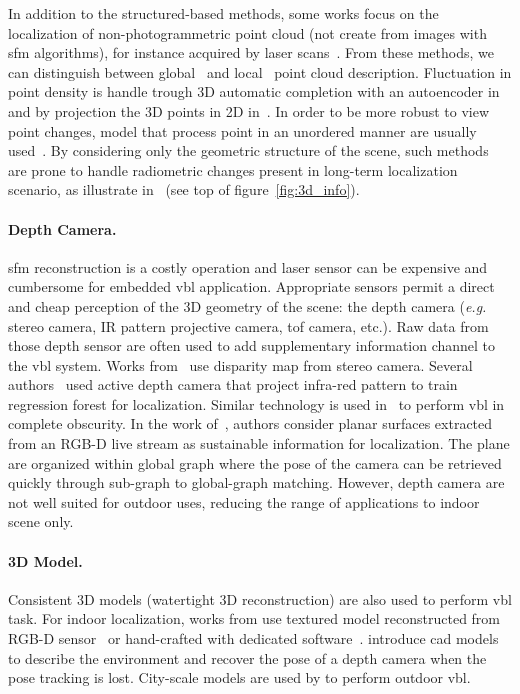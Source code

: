 			In addition to the structured-based methods, some works focus on the localization of non-photogrammetric point cloud (\ie not create from images with \ac{sfm} algorithms), for instance acquired by laser scans~\citep{Elbaz2017,Uy2018,Schonberger2017a,Zeng2016,Yew2018,Deng2018}. From these methods, we can distinguish between global~\citep{Uy2018,Schonberger2017a} and local~\citep{Elbaz2017,Zeng2016,Yew2018,Deng2018} point cloud description. Fluctuation in point density is handle trough 3D automatic completion with an autoencoder in~\citep{Schonberger2017a} and by projection the 3D points in 2D in~\citep{Elbaz2017}. In order to be more robust to view point changes, model that process point in an unordered manner are usually used~\citep{Yew2018,Deng2018}. By considering only the geometric structure of the scene, such methods are prone to handle radiometric changes present in long-term localization scenario, as illustrate in~\citep{Schonberger2017a,Uy2018} (see top of figure~\ref{fig:3d_info}).

		\paragraph{Depth Camera.}
			\Ac{sfm} reconstruction is a costly operation and laser sensor can be expensive and cumbersome for embedded \ac{vbl} application. Appropriate sensors permit a direct and cheap perception of the 3D geometry of the scene: the depth camera (\textit{e.g.} stereo camera, IR pattern projective camera, \ac{tof} camera, etc.). Raw data from those depth sensor are often used to add supplementary information channel to the \ac{vbl} system. Works from~\citep{Ni2009,McManus2014,Wan2014} use disparity map from stereo camera. Several authors~\citep{Shotton2013,Guzman-rivera2014,Glocker2015} used active depth camera that project infra-red pattern to train regression forest for localization. Similar technology is used in~\citep{Li2016a} to perform \ac{vbl} in complete obscurity. In the work of~\citep{Fernandez-Moral2013}, authors consider planar surfaces extracted from an RGB-D live stream as sustainable information for localization. The plane are organized within global graph where the pose of the camera can be retrieved quickly through sub-graph to global-graph matching.  However, depth camera are not well suited for outdoor uses, reducing the range of applications to indoor scene only.

		\paragraph{3D Model.}
			Consistent 3D models (\ie watertight 3D reconstruction) are also used to perform \ac{vbl} task.  For indoor localization, works from \citep{Shotton2013,Pascoe2015} use textured model reconstructed from RGB-D sensor~\citep{Shotton2013} or hand-crafted with dedicated software~\citep{Pascoe2015}. \citet{Salas-Moreno2013} introduce \ac{cad} models to describe the environment and recover the pose of a depth camera when the pose tracking is lost. City-scale models are used by \citep{Aubry2014,Poglitsch2015,Pascoe2015a,Pascoe2015b,Caselitz2016} to perform outdoor \ac{vbl}. 

